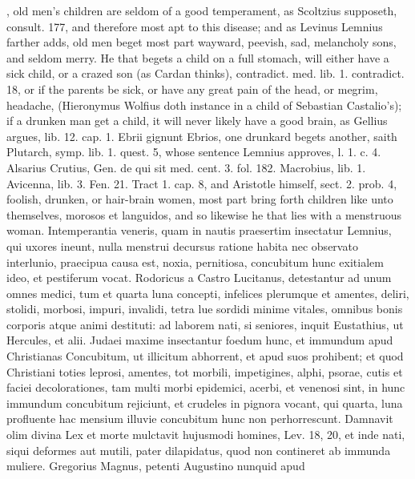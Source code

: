 {{, old men's children
are seldom of a good temperament, as Scoltzius supposeth, consult. 177,
and therefore most apt to this disease; and as Levinus Lemnius
farther adds, old men beget most part wayward, peevish, sad, melancholy
sons, and seldom merry. He that begets a child on a full stomach, will
either have a sick child, or a crazed son (as Cardan thinks),
contradict. med. lib. 1. contradict. 18, or if the parents be sick, or
have any great pain of the head, or megrim, headache, (Hieronymus
Wolfius doth instance in a child of Sebastian Castalio's); if a
drunken man get a child, it will never likely have a good brain, as
Gellius argues, lib. 12. cap. 1. Ebrii gignunt Ebrios, one drunkard
begets another, saith Plutarch, symp. lib. 1. quest. 5, whose
sentence Lemnius approves, l. 1. c. 4. Alsarius Crutius, Gen. de
qui sit med. cent. 3. fol. 182. Macrobius, lib. 1. Avicenna, lib. 3.
Fen. 21. Tract 1. cap. 8, and Aristotle himself, sect. 2. prob. 4,
foolish, drunken, or hair-brain women, most part bring forth children
like unto themselves, morosos et languidos, and so likewise he that
lies with a menstruous woman. Intemperantia veneris, quam in nautis
praesertim insectatur  Lemnius, qui uxores ineunt, nulla menstrui
decursus ratione habita nec observato interlunio, praecipua causa est,
noxia, pernitiosa, concubitum hunc exitialem ideo, et pestiferum vocat.
Rodoricus a Castro Lucitanus, detestantur ad unum omnes medici,
tum et quarta luna concepti, infelices plerumque et amentes, deliri,
stolidi, morbosi, impuri, invalidi, tetra lue sordidi minime vitales,
omnibus bonis corporis atque animi destituti: ad laborem nati, si
seniores, inquit Eustathius, ut Hercules, et alii. Judaei maxime
insectantur foedum hunc, et immundum apud Christianas Concubitum, ut
illicitum abhorrent, et apud suos prohibent; et quod Christiani toties
leprosi, amentes, tot morbili, impetigines, alphi, psorae, cutis et
faciei decolorationes, tam multi morbi epidemici, acerbi, et venenosi
sint, in hunc immundum concubitum rejiciunt, et crudeles in pignora
vocant, qui quarta, luna profluente hac mensium illuvie concubitum hunc
non perhorrescunt. Damnavit olim divina Lex et morte mulctavit
hujusmodi homines, Lev. 18, 20, et inde nati, siqui deformes aut
mutili, pater dilapidatus, quod non contineret ab  immunda
muliere. Gregorius Magnus, petenti Augustino nunquid apud
}}

